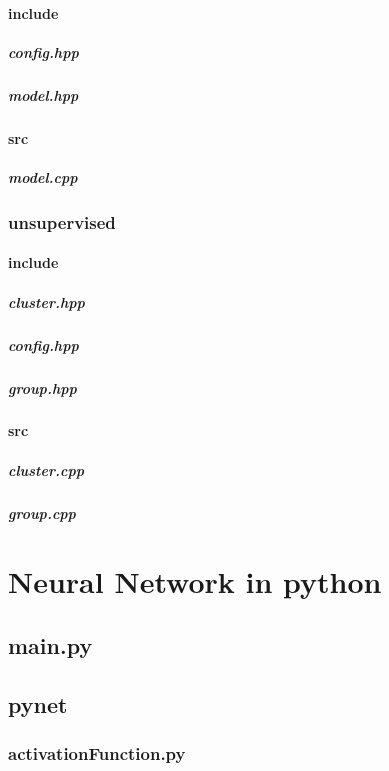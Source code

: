 \documentclass[12pt]{article}
\newcommand{\incDemo}[2]{\label{demo:#2}\newpage}
\newcommand{\incNN}[2]{\label{NN:#2}\newpage}
\begin{document}
\paragraph{include}														%
\subparagraph{config.hpp}											\incDemo{c++}{supervised/include/config.hpp}
\subparagraph{model.hpp}											\incDemo{c++}{supervised/include/model.hpp}
\paragraph{src}																%
\subparagraph{model.cpp}												\incDemo{c++}{supervised/src/model.cpp}
\subsubsection{unsupervised}										%
\paragraph{include}														%
\subparagraph{cluster.hpp}											\incDemo{c++}{unsupervised/include/cluster.hpp}
\subparagraph{config.hpp}											\incDemo{c++}{unsupervised/include/config.hpp}
\subparagraph{group.hpp}												\incDemo{c++}{unsupervised/include/group.hpp}
\paragraph{src}																%
\subparagraph{cluster.cpp}											\incDemo{c++}{unsupervised/src/cluster.cpp}
\subparagraph{group.cpp}												\incDemo{c++}{unsupervised/src/group.cpp}

\section{Neural Network in python}
\subsection{main.py}														\incNN{python}{main.py}
\subsection{pynet}															%
\subsubsection{activationFunction.py}							\incNN{python}{pynet/activationFunction.py}
\end{document}

